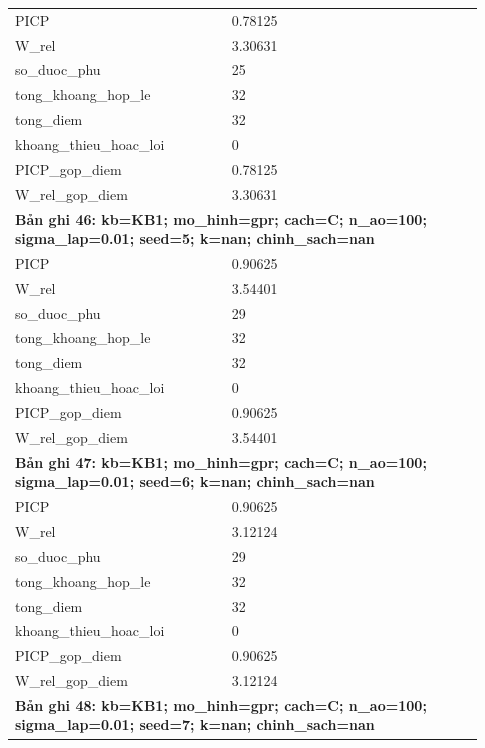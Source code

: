 \begin{longtable}{p{0.43\linewidth}p{0.50\linewidth}}
PICP & 0.78125 \\
W\_\allowbreak rel & 3.30631 \\
so\_\allowbreak duoc\_\allowbreak phu & 25 \\
tong\_\allowbreak khoang\_\allowbreak hop\_\allowbreak le & 32 \\
tong\_\allowbreak diem & 32 \\
khoang\_\allowbreak thieu\_\allowbreak hoac\_\allowbreak loi & 0 \\
PICP\_\allowbreak gop\_\allowbreak diem & 0.78125 \\
W\_\allowbreak rel\_\allowbreak gop\_\allowbreak diem & 3.30631 \\
\midrule
\multicolumn{2}{p{0.95\linewidth}}{\textbf{Bản ghi 46: kb=KB1; mo\_hinh=gpr; cach=C; n\_ao=100; sigma\_lap=0.01; seed=5; k=nan; chinh\_sach=nan}} \\
PICP & 0.90625 \\
W\_\allowbreak rel & 3.54401 \\
so\_\allowbreak duoc\_\allowbreak phu & 29 \\
tong\_\allowbreak khoang\_\allowbreak hop\_\allowbreak le & 32 \\
tong\_\allowbreak diem & 32 \\
khoang\_\allowbreak thieu\_\allowbreak hoac\_\allowbreak loi & 0 \\
PICP\_\allowbreak gop\_\allowbreak diem & 0.90625 \\
W\_\allowbreak rel\_\allowbreak gop\_\allowbreak diem & 3.54401 \\
\midrule
\multicolumn{2}{p{0.95\linewidth}}{\textbf{Bản ghi 47: kb=KB1; mo\_hinh=gpr; cach=C; n\_ao=100; sigma\_lap=0.01; seed=6; k=nan; chinh\_sach=nan}} \\
PICP & 0.90625 \\
W\_\allowbreak rel & 3.12124 \\
so\_\allowbreak duoc\_\allowbreak phu & 29 \\
tong\_\allowbreak khoang\_\allowbreak hop\_\allowbreak le & 32 \\
tong\_\allowbreak diem & 32 \\
khoang\_\allowbreak thieu\_\allowbreak hoac\_\allowbreak loi & 0 \\
PICP\_\allowbreak gop\_\allowbreak diem & 0.90625 \\
W\_\allowbreak rel\_\allowbreak gop\_\allowbreak diem & 3.12124 \\
\midrule
\multicolumn{2}{p{0.95\linewidth}}{\textbf{Bản ghi 48: kb=KB1; mo\_hinh=gpr; cach=C; n\_ao=100; sigma\_lap=0.01; seed=7; k=nan; chinh\_sach=nan}} \\

\end{longtable}
